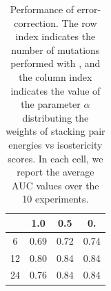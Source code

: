 \begin{table}
\begin{center}
\begin{tabular}{|c|c|c|c|}
\hline
& 1.0 & 0.5 & 0. \\
\hline
6 & 0.69 & 0.72 & 0.74 \\
12 & 0.80 & 0.84 & 0.84 \\
24 & 0.76 & 0.84 & 0.84 \\
\hline
\end{tabular}
\end{center}
\caption{Performance of error-correction. The row index indicates the number of mutations performed with \RNApyro, and the column index indicates
the value of the parameter $\alpha$ distributing the weights of stacking pair energies vs isostericity scores. In each cell, we report the average AUC
values over the 10 experiments.}
\label{tab:benchmark}
\end{table}



